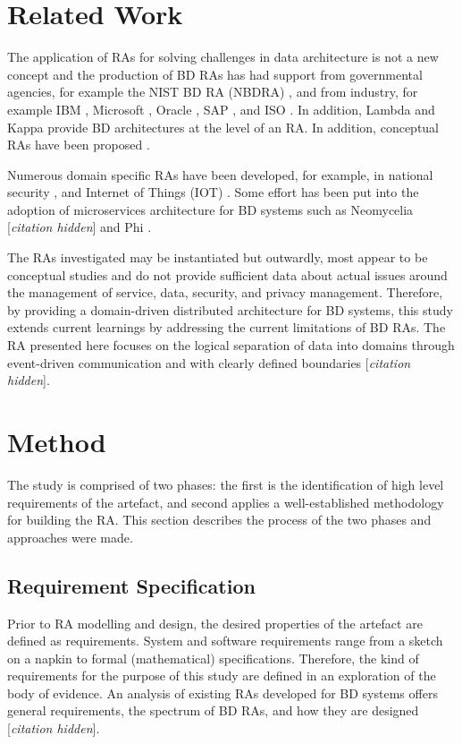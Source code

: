 \documentclass[a4paper,11pt]{article}
\let\cite\citep
\newcommand{\hc}{[\textit{citation hidden}]\textnormal{}}
\begin{document}
\section{Related Work}

The application of RAs for solving challenges in data architecture is not a new concept and the production of BD RAs has had support from governmental agencies, for example the NIST BD RA (NBDRA) \cite{Chang}, and from industry, for example IBM \cite{quintero2019ibm}, Microsoft \cite{levin2013big}, Oracle \cite{cackett2013information}, SAP \cite{SAPRA}, and ISO \cite{ISO20547}. In addition, Lambda \cite{kiran2015lambda} and Kappa \cite{lin2017lambda} provide BD architectures at the level of an RA. In addition, conceptual RAs have been proposed \cite{Maier,suthakar2017scalable,framework2015draft}.

Numerous domain specific RAs have been developed, for example, in national security \cite{Klein}, and Internet of Things (IOT)  \cite{weyrich2015reference}. Some effort has been put into the adoption of microservices architecture for BD systems such as Neomycelia 
\hc{}\hspace{1mm}
 and Phi \cite{maamouri2021phi}. 
 
The RAs investigated may be instantiated but outwardly, most appear to be conceptual studies and do not provide sufficient data about actual issues around the management of service, data, security, and privacy management. Therefore, by providing a domain-driven distributed architecture for BD systems, this study extends current learnings by addressing the current limitations of BD RAs. 
The RA presented here focuses on the logical separation of data into domains through event-driven communication and with clearly defined boundaries %
\hc{}. 

\section{Method}
The study is comprised of two phases: the first is the identification of high level requirements of the artefact, and second applies a well-established methodology for building the RA. This section describes the process of the two phases and approaches were made.


\subsection{Requirement Specification}
Prior to RA modelling and design, the desired properties of the artefact are defined as requirements. System and software requirements range from a sketch on a napkin to formal (mathematical) specifications. Therefore, the kind of requirements for the purpose of this study are defined in an exploration of the body of evidence. An analysis of existing RAs developed for BD systems offers general requirements, the spectrum of BD RAs, and how they are designed 
\hc.
\end{document}
